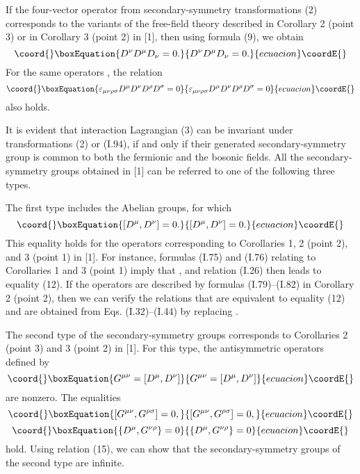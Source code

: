 \documentclass[a4paper,12pt]{article}
\begin{document}
If the four-vector operator \coordHE{} from secondary-symmetry transformations
(2) corresponds to the variants of the free-field theory described in Corollary
2 (point 3) or in Corollary 3 (point 2) in [1], then using formula (9), we
obtain  
\begin{equation}\coord{}\boxEquation{
D^{\nu}D^{\mu}D_{\nu}=0.
}{
D^{\nu}D^{\mu}D_{\nu}=0.
}{ecuacion}\coordE{}\end{equation}
For the same operators \coordHE{}, the relation 
\begin{equation}\coord{}\boxEquation{
\varepsilon_{\mu\nu\rho\sigma}D^{\mu}D^{\nu}D^{\rho}D^{\sigma}=0
}{
\varepsilon_{\mu\nu\rho\sigma}D^{\mu}D^{\nu}D^{\rho}D^{\sigma}=0
}{ecuacion}\coordE{}\end{equation}
also holds.

It is evident that interaction Lagrangian (3) can be invariant under
transformations (2) or (I.94), if and only if their generated 
secondary-symmetry group is common to both the fermionic and the bosonic 
fields. All the secondary-symmetry groups obtained in [1] can be referred to 
one of the following three types.

The first type includes the Abelian groups, for which
\begin{equation}\coord{}\boxEquation{
[D^{\mu}, D^{\nu}]=0.
}{
[D^{\mu}, D^{\nu}]=0.
}{ecuacion}\coordE{}\end{equation}
This equality holds for the operators \coordHE{} corresponding to Corollaries 1,
2 (point 2), and 3 (point 1) in [1]. For instance, formulas (I.75) and (I.76)
relating to Corollaries 1 and 3 (point 1) imply that \coordHE{}, and relation (I.26) then leads to equality (12). If the
operators \coordHE{} are described by formulas (I.79)--(I.82) in Corollary 2
(point 2), then we can verify the relations that are equivalent to equality
(12) and are obtained from Eqs. (I.32)--(I.44) by replacing \coordHE{}.

The second type of the secondary-symmetry groups corresponds to Corollaries 2
(point 3) and 3 (point 2) in [1]. For this type, the antisymmetric operators
\coordHE{} defined by
\begin{equation}\coord{}\boxEquation{
G^{\mu\nu} = [D^{\mu}, D^{\nu}]
}{
G^{\mu\nu} = [D^{\mu}, D^{\nu}]
}{ecuacion}\coordE{}\end{equation}
are nonzero. The equalities
\begin{equation}\coord{}\boxEquation{
[G^{\mu\nu}, G^{\rho\sigma}] = 0,
}{
[G^{\mu\nu}, G^{\rho\sigma}] = 0,
}{ecuacion}\coordE{}\end{equation}
\begin{equation}\coord{}\boxEquation{
\{ D^{\mu}, G^{\nu\rho} \} = 0
}{
\{ D^{\mu}, G^{\nu\rho} \} = 0
}{ecuacion}\coordE{}\end{equation}
hold. Using relation (15), we can show that the secondary-symmetry groups of 
the second type are infinite.
\end{document}
